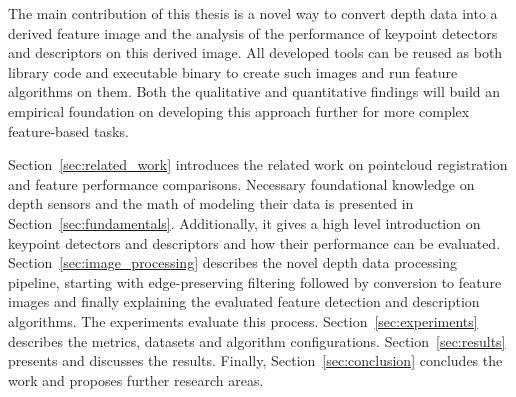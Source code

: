 The main contribution of this thesis is a novel way to convert depth data into a derived feature image and the analysis of the performance of keypoint detectors and descriptors on this derived image.
All developed tools can be reused as both library code and executable binary to create such images and run \gls{feature} algorithms on them.
Both the qualitative and quantitative findings will build an empirical foundation on developing this approach further for more complex feature-based tasks.

Section~\ref{sec:related_work} introduces the related work on pointcloud registration and \gls{feature} performance comparisons.
Necessary foundational knowledge on depth sensors and the math of modeling their data is presented in Section~\ref{sec:fundamentals}.
Additionally, it gives a high level introduction on keypoint detectors and descriptors and how their performance can be evaluated.
Section~\ref{sec:image_processing} describes the novel depth data processing pipeline, starting with edge-preserving filtering followed by conversion to feature images and finally explaining the evaluated \gls{feature} detection and description algorithms.
The experiments evaluate this process.
Section~\ref{sec:experiments} describes the metrics, datasets and algorithm configurations.
Section~\ref{sec:results} presents and discusses the results.
Finally, Section~\ref{sec:conclusion} concludes the work and proposes further research areas.
